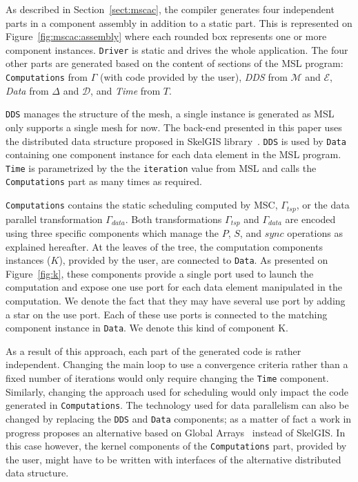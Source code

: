 As described in Section~\ref{sect:mscac}, the compiler generates four independent parts in a component assembly in addition to a static part.
This is represented on Figure~\ref{fig:mscac:assembly} where each rounded box represents one or more component instances.
\texttt{Driver} is static and drives the whole application.
The four other parts are generated based on the content of sections of the MSL program: \texttt{Computations} from $\Gamma$ (with code provided by the user), \emph{DDS} from $\mathcal{M}$ and $\mathcal{E}$, \emph{Data} from $\Delta$ and $\mathcal{D}$, and \emph{Time} from $T$.

\texttt{DDS} manages the structure of the mesh, a single instance is generated as MSL only supports a single mesh for now.
The back-end presented in this paper uses the distributed data structure proposed in SkelGIS library~\cite{CPE:CPE3494}.
\texttt{DDS} is used by \texttt{Data} containing one component instance for each data element in the MSL program.
\texttt{Time} is parametrized by the the \texttt{iteration} value from MSL and calls the \texttt{Computations} part as many times as required.

\texttt{Computations} contains the static scheduling computed by MSC, \ie $\Gamma_{tsp}$, or the data parallel transformation $\Gamma_{data}$.
Both transformations $\Gamma_{tsp}$ and $\Gamma_{data}$ are encoded using three specific components which manage the $P$, $S$, and $sync$ operations as explained hereafter.
At the leaves of the tree, the computation components instances ($K$), provided by the user, are connected to \texttt{Data}.
As presented on Figure~\ref{fig:k}, these components provide a single port used to launch the computation and expose one use port for each data element manipulated in the computation.
We denote the fact that they may have several use port by adding a star on the use port.
Each of these use ports is connected to the matching component instance in \texttt{Data}.
We denote this kind of component K.

As a result of this approach, each part of the generated code is rather independent.
Changing the main loop to use a convergence criteria rather than a fixed number of iterations would only require changing the \texttt{Time} component.
Similarly, changing the approach used for scheduling would only impact the code generated in \texttt{Computations}.
The technology used for data parallelism can also be changed by replacing the \texttt{DDS} and \texttt{Data} components; as a matter of fact a work in progress proposes an alternative based on Global Arrays~\cite{Nieplocha:2006:AAP:1125980.1125985} instead of SkelGIS.
In this case however, the kernel components of the \texttt{Computations} part, provided by the user, might have to be written with interfaces of the alternative distributed data structure.

